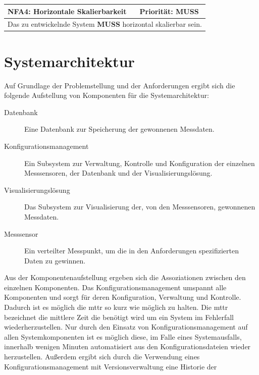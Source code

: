 \documentclass[titlepage]{report}
\begin{document}
\begin{center}
\begin{tabular}{p{}>{\raggedleft\arraybackslash}p{}}\toprule
    \textbf{NFA4: Horizontale Skalierbarkeit} & \textbf{Priorität: MUSS} \\\midrule
	\multicolumn{2}{p{\textwidth-\tabcolsep}}{%
        Das zu entwickelnde System \textbf{MUSS} horizontal skalierbar
        sein.
        }\\\bottomrule
\end{tabular}
    \label{table:NFA4}
\end{center}

\section*{Systemarchitektur}
Auf Grundlage der Problemstellung und der Anforderungen ergibt sich die
folgende Aufstellung von Komponenten für die Systemarchitektur:
\begin{description}
    \item[Datenbank] Eine Datenbank zur Speicherung der
                     gewonnenen Messdaten.
    \item[Konfigurationsmanagement] Ein Subsystem zur Verwaltung, Kontrolle
        und Konfiguration der einzelnen Messsensoren, der Datenbank und
        der Visualisierungslösung.
    \item[Visualisierungslösung] Das Subsystem zur Visualisierung der, von
        den Messsensoren, gewonnenen Messdaten.
    \item[Messsensor] Ein verteilter Messpunkt, um die in den
        Anforderungen spezifizierten Daten zu gewinnen.
\end{description}
Aus der Komponentenaufstellung ergeben sich die Assoziationen zwischen
den einzelnen Komponenten. Das Konfigurationsmanagement umspannt alle
Komponenten und sorgt für deren Konfiguration, Verwaltung und Kontrolle.
Dadurch ist es möglich die \gls{mttr} so kurz wie möglich zu halten. Die
\gls{mttr} bezeichnet die mittlere Zeit die benötigt wird um ein System
im Fehlerfall wiederherzustellen\cite{MTTR}. Nur durch den Einsatz von
Konfigurationsmanagement auf allen Systemkomponenten ist es möglich
diese, im Falle eines Systemausfalls, innerhalb
wenigen Minuten automatisiert aus den Konfigurationsdateien wieder
herzustellen. Außerdem ergibt sich durch die Verwendung eines
Konfigurationsmanagement mit Versionsverwaltung eine Historie der
\end{document}
